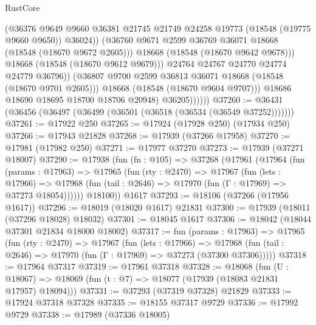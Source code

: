 \begin{lexlean}{RustCore}
\begin{coremodule}
                              (@36376
                                @9649
                                @9660
                                @36381
                                @21745
                                @21749
                                @24258
                                @19773
                                (@18548 (@19775 @9660 @9650))
                                @36024))
                            (@36760 @9671 @2599 @36769 @36071 @18668 (@18548 (@18670 @9672 @2605)))
                            @18668
                            (@18548 (@18670 @9642 @9678)))
                          @18668
                          (@18548 (@18670 @9612 @9679)))
                        @24764
                        @24767
                        @24770
                        @24774
                        @24779
                        @36796))
                    (@36807 @9700 @2599 @36813 @36071 @18668 (@18548 (@18670 @9701 @2605)))
                    @18668
                    (@18548 (@18670 @9604 @9707)))
                  @18686
                  @18690
                  @18695
                  @18700
                  @18706
                  @20948)
                @36205))))))
@37260 := @36431 (@36456 (@36497 (@36499 (@36501 (@36518 (@36534 (@36549 @37252)))))))
@37261 := @17922 @250
@37265 := @17924 (@17928 @250) (@17934 @250)
@37266 := @17943 @21828
@37268 := @17939 (@37266 @17958)
@37270 := @17981 (@17982 @250)
@37271 := @17977 @37270
@37273 := @17939 (@37271 @18007)
@37290 := @17938
    (fun (fn : @105) =>
    @37268
      (@17961
        (@17964
          (fun (params : @17963) =>
          @17965
            (fun (rty : @2470) =>
            @17967
              (fun (lets : @17966) =>
              @17968 (fun (tail : @2646) => @17970 (fun (Γ : @17969) => @37273 @18054))))))
        @18100))
    @1617
@37293 := @18106 (@37266 (@17956 @1617))
@37296 := @18019 (@18020 @1617) @21831
@37300 := @17939 (@18011 (@37296 @18028) @18032)
@37301 := @18045 @1617
@37306 := @18042 (@18044 @37301 @21834 @18000 @18002)
@37317 := fun (params : @17963) =>
  @17965
    (fun (rty : @2470) =>
    @17967
      (fun (lets : @17966) =>
      @17968 (fun (tail : @2646) => @17970 (fun (Γ : @17969) => @37273 (@37300 @37306)))))
@37318 := @17964 @37317
@37319 := @17961 @37318
@37328 := @18068
    (fun (U : @18067) => @18069 (fun (t : @7) => @18077 (@17939 (@18083 @21831 @17957) @18094)))
@37331 := @37293 (@37319 @37328) @21829
@37333 := @17924 @37318 @37328
@37335 := @18155 @37317 @9729
@37336 := @17992 @9729
@37338 := @17989 (@37336 @18005)

\end{coremodule}
\end{lexlean}
